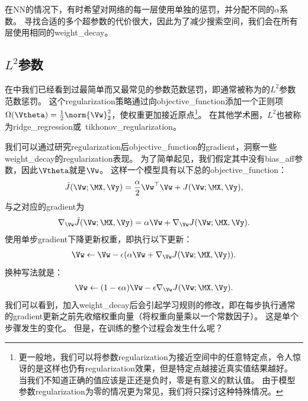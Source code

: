 在\gls{NN}的情况下，有时希望对网络的每一层使用单独的惩罚，并分配不同的$\alpha$系数。
寻找合适的多个超参数的代价很大，因此为了减少搜索空间，我们会在所有层使用相同的\gls{weight_decay}。


\subsection{$L^2$参数}
\label{sec:l2_parameter_regularization}
在中我们已经看到过最简单而又最常见的参数范数惩罚，即通常被称为的$L^2$参数范数惩罚。
这个\gls{regularization}策略通过向\gls{objective_function}添加一个正则项$\Omega(\Vtheta) = \frac{1}{2} \norm{\Vw}_2^2$，使权重更加接近原点\footnote{更一般地，我们可以将参数\gls{regularization}为接近空间中的任意特定点，令人惊讶的是这样也仍有\gls{regularization}效果，但是特定点越接近真实值结果越好。
当我们不知道正确的值应该是正还是负时，零是有意义的默认值。
由于模型参数\gls{regularization}为零的情况更为常见，我们将只探讨这种特殊情况。}。
在其他学术圈，$L^2$也被称为\gls{ridge_regression}或~\gls{tikhonov_regularization}。

我们可以通过研究\gls{regularization}后\gls{objective_function}的\gls{gradient}，洞察一些\gls{weight_decay}的\gls{regularization}表现。
为了简单起见，我们假定其中没有\gls{bias_aff}参数，因此$\Vtheta$就是$\Vw$。
这样一个模型具有以下总的\gls{objective_function}：
\begin{align}
  \tilde{J}(\Vw;\MX, \Vy) =\frac{\alpha}{2} \Vw^\top \Vw +  J(\Vw;\MX, \Vy),
\end{align}
与之对应的\gls{gradient}为
\begin{align}
 \nabla_{\Vw} \tilde{J}(\Vw;\MX,\Vy) =\alpha \Vw +  \nabla_{\Vw} J(\Vw;\MX, \Vy).
\end{align}
使用单步\gls{gradient}下降更新权重，即执行以下更新：
\begin{align}
 \Vw \leftarrow \Vw - \epsilon(\alpha \Vw + \nabla_{\Vw} J(\Vw;\MX, \Vy)).
\end{align}
换种写法就是：
\begin{align}
 \Vw \leftarrow (1-\epsilon \alpha)\Vw - \epsilon \nabla_{\Vw} J(\Vw;\MX, \Vy).
\end{align}
我们可以看到，加入\gls{weight_decay}后会引起学习规则的修改，即在每步执行通常的\gls{gradient}更新之前先收缩权重向量（将权重向量乘以一个常数因子）。
这是单个步骤发生的变化。
但是，在训练的整个过程会发生什么呢？



